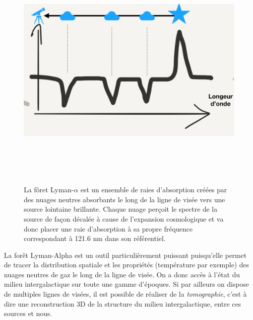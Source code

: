 \begin{figure}[htbp]
	\centering
		\includegraphics[height=12cm]{figs/lya.png}
		\caption[Principe de la forêt Lyman-$\alpha$]{La fôret Lyman-$\alpha$ est un ensemble de raies d'absorption créées par des nuages neutres absorbants le long de la ligne de visée vers une source lointaine brillante. Chaque nuage perçoit le spectre de la source de façon décalée à cause de l'expansion cosmologique et va donc placer une raie d'absorption à sa propre fréquence correspondant à 121.6 nm dans son référentiel.}
	\label{f:lya}
\end{figure}

La forêt Lyman-Alpha est un outil particulièrement puissant puisqu'elle permet de tracer la distribution spatiale et les propriétés (température par exemple) des nuages neutres de gaz le long de la ligne de visée. On a donc accès à l'état du milieu intergalactique sur toute une gamme d'époques. Si par ailleurs on dispose de multiples lignes de visées, il est possible de réaliser de la \textit{tomographie}, c'est à dire une reconstruction 3D de la structure du milieu intergalactique, entre ces sources et nous.

